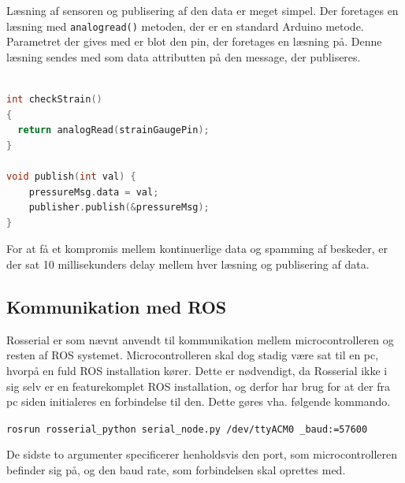 Læsning af sensoren og publisering af den data er meget simpel. Der foretages en læsning med \texttt{analogread()} metoden, der er en standard Arduino metode. Parametret der gives med er blot den pin, der foretages en læsning på. 
Denne læsning sendes med som data attributten på den message, der publiseres. 

\begin{lstlisting}[language=C]

int checkStrain()
{
  return analogRead(strainGaugePin);
}

void publish(int val) {
	pressureMsg.data = val;
	publisher.publish(&pressureMsg);
}

\end{lstlisting}

For at få et kompromis mellem kontinuerlige data og spamming af beskeder, er der sat 10 millisekunders delay mellem hver læsning og publisering af data. 

\subsection{Kommunikation med ROS}
Rosserial er som nævnt anvendt til kommunikation mellem microcontrolleren og resten af ROS systemet. Microcontrolleren skal dog stadig være sat til en pc, hvorpå en fuld ROS installation kører. Dette er nødvendigt, da Rosserial ikke i sig selv er en featurekomplet ROS installation, og derfor har brug for at der fra pc siden initialeres en forbindelse til den. Dette gøres vha. følgende kommando. 

	\texttt{rosrun rosserial\_python serial\_node.py /dev/ttyACM0 \_baud:=57600}
	
	De sidste to argumenter specificerer henholdsvis den port, som microcontrolleren befinder sig på, og den baud rate, som forbindelsen skal oprettes med.










